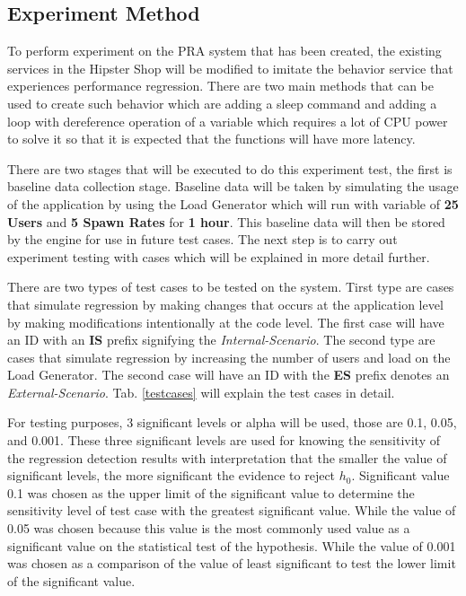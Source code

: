 \documentclass[conference]{configs/IEEEtran}
\begin{document}
\subsection{Experiment Method}
To perform experiment on the PRA system that has been created, the existing services in the Hipster Shop will be modified to imitate the behavior service that experiences performance regression. There are two main methods that can be used to create such behavior which are adding a sleep command and adding a loop with dereference operation of a variable which requires a lot of CPU power to solve it so that it is expected that the functions will have more latency.

There are two stages that will be executed to do this experiment test, the first is baseline data collection stage. Baseline data will be taken by simulating
the usage of the application by using the Load Generator which will run with variable of \textbf{25 Users} and \textbf{5 Spawn Rates} for \textbf{1 hour}. This baseline data will then be stored by the engine for use in future test cases. The next step is to carry out experiment testing with cases which will be explained in more detail further.

There are two types of test cases to be tested on the system. Tirst type are cases that simulate regression by making changes that occurs at the application level by making modifications intentionally at the code level.
The first case will have an ID with an \textbf{IS} prefix signifying the \textit{Internal-Scenario}.
The second type are cases that simulate regression by increasing the number of users and load on the Load Generator. The second case will have an ID with the \textbf{ES} prefix denotes an \textit{External-Scenario}. Tab. \ref{testcases} will explain the test cases in detail.

For testing purposes, 3 significant levels or alpha will be used, those are 0.1, 0.05, and 0.001. These three significant levels are used for knowing the sensitivity of the regression detection results with interpretation that the smaller the value of
significant levels, the more significant the evidence to reject $h_{0}$. Significant value 0.1
was chosen as the upper limit of the significant value to determine the sensitivity level of test case with the greatest significant value. While the value of 0.05 was chosen because this value is the most commonly used value as a significant value on the statistical test of the hypothesis. While the value of 0.001 was chosen as a comparison of the value of least significant to test the lower limit of the significant value.
\end{document}
